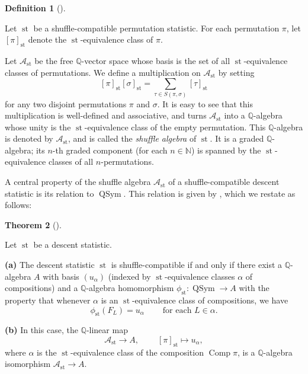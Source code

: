 \documentclass[numbers=enddot,12pt,final,onecolumn,notitlepage]{scrartcl}%
\theoremstyle{definition}
\newtheorem{theo}{Theorem}[section]
\newenvironment{theorem}[1][]
{\begin{theo}[#1]\begin{leftbar}}
{\end{leftbar}\end{theo}}
\newtheorem{defi}[theo]{Definition}
\newenvironment{definition}[1][]
{\begin{defi}[#1]\begin{leftbar}}
{\end{leftbar}\end{defi}}
\let\sumnonlimits\sum
\renewcommand{\sum}{\sumnonlimits\limits}
\begin{document}
\begin{definition}
\label{def.Ast}Let $\operatorname*{st}$ be a shuffle-compatible permutation
statistic. For each permutation $\pi$, let $\left[  \pi\right]
_{\operatorname*{st}}$ denote the $\operatorname*{st}$-equivalence class of
$\pi$.

Let $\mathcal{A}_{\operatorname*{st}}$ be the free $\mathbb{Q}$-vector space
whose basis is the set of all $\operatorname*{st}$-equivalence classes of
permutations. We define a multiplication on $\mathcal{A}_{\operatorname*{st}}$
by setting%
\[
\left[  \pi\right]  _{\operatorname*{st}}\left[  \sigma\right]
_{\operatorname*{st}}=\sum_{\tau\in S\left(  \pi,\sigma\right)  }\left[
\tau\right]  _{\operatorname*{st}}%
\]
for any two disjoint permutations $\pi$ and $\sigma$. It is easy to see that
this multiplication is well-defined and associative, and turns $\mathcal{A}%
_{\operatorname*{st}}$ into a $\mathbb{Q}$-algebra whose unity is the
$\operatorname*{st}$-equivalence class of the empty permutation. This
$\mathbb{Q}$-algebra is denoted by $\mathcal{A}_{\operatorname*{st}}$, and is
called the \textit{shuffle algebra} of $\operatorname*{st}$. It is a graded
$\mathbb{Q}$-algebra; its $n$-th graded component (for each $n\in\mathbb{N}$)
is spanned by the $\operatorname*{st}$-equivalence classes of all $n$-permutations.
\end{definition}

A central property of the shuffle algebra $\mathcal{A}_{\operatorname*{st}}$
of a shuffle-compatible descent statistic is its relation to
$\operatorname*{QSym}$. This relation is given by \cite[Theorem 4.3]{part1},
which we restate as follows:

\begin{theorem}
\label{thm.4.3}Let $\operatorname*{st}$ be a descent statistic.

\textbf{(a)} The descent statistic $\operatorname*{st}$ is shuffle-compatible
if and only if there exist a $\mathbb{Q}$-algebra $A$ with basis $\left(
u_{\alpha}\right)  $ (indexed by $\operatorname*{st}$-equivalence classes
$\alpha$ of compositions) and a $\mathbb{Q}$-algebra homomorphism
$\phi_{\operatorname*{st}}:\operatorname*{QSym}\rightarrow A$ with the
property that whenever $\alpha$ is an $\operatorname*{st}$-equivalence class
of compositions, we have%
\[
\phi_{\operatorname*{st}}\left(  F_{L}\right)  =u_{\alpha}%
\ \ \ \ \ \ \ \ \ \ \text{for each }L\in\alpha.
\]


\textbf{(b)} In this case, the $\mathbb{Q}$-linear map%
\[
\mathcal{A}_{\operatorname*{st}}\rightarrow A,\ \ \ \ \ \ \ \ \ \ \left[
\pi\right]  _{\operatorname*{st}}\mapsto u_{\alpha},
\]
where $\alpha$ is the $\operatorname*{st}$-equivalence class of the
composition $\operatorname*{Comp}\pi$, is a $\mathbb{Q}$-algebra isomorphism
$\mathcal{A}_{\operatorname*{st}}\rightarrow A$.
\end{theorem}
\end{document}
